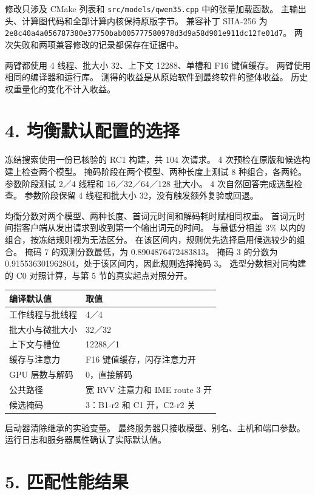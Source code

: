 \documentclass[10pt,a4paper,fontset=none]{ctexart}
\begin{document}
修改只涉及 CMake 列表和 \nolinkurl{src/models/qwen35.cpp}
中的张量加载函数。 主输出头、计算图代码和全部计算内核保持原版字节。
兼容补丁 SHA-256 为
\texttt{2e8c40a4\allowbreak{}a0567873\allowbreak{}80e37750\allowbreak{}bab00577\allowbreak{}7580978d\allowbreak{}3d9a58d9\allowbreak{}01e911dc\allowbreak{}12fe01d7}。
两次失败和两项兼容修改的记录都保存在证据中。

两臂都使用 4 线程、批大小 32、上下文 12288、单槽和 F16 键值缓存。
两臂使用相同的编译器和运行库。
测得的收益是从原始软件到最终软件的整体收益。
历史权重量化的变化不计入收益。

\hypertarget{ux5747ux8861ux9ed8ux8ba4ux914dux7f6eux7684ux9009ux62e9}{%
\section{4.
均衡默认配置的选择}\label{ux5747ux8861ux9ed8ux8ba4ux914dux7f6eux7684ux9009ux62e9}}

冻结搜索使用一份已核验的 RC1 构建，共 104 次请求。 4
次预检在原版和候选构建上检查两个模型。
掩码阶段在两个模型、两种长度上测试 8 种组合，各两轮。 参数阶段测试 2／4
线程和 16／32／64／128 批大小。 4 次自然回答完成选型检查。 参数阶段保留
4 线程和批大小 32，没有触发额外复验或回退。

均衡分数对两个模型、两种长度、首词元时间和解码耗时赋相同权重。
首词元时间指客户端从发出请求到收到第一个输出词元的时间。 与最低分相差
3\% 以内的组合，按冻结规则视为无法区分。
在该区间内，规则优先选择启用候选较少的组合。 掩码 7 的观测分数最低，为
0.8904876472483813。 掩码 3 的分数为
0.915536301962804，处于该区间内，因此规则选择掩码 3。
选型分数相对同构建的 C0 对照计算，与第 5 节的真实起点对照分开。

\begin{longtable}[]{@{}ll@{}}
\toprule
编译默认值 & 取值\tabularnewline
\midrule
\endhead
工作线程与批线程 & 4／4\tabularnewline
批大小与微批大小 & 32／32\tabularnewline
上下文与槽位 & 12288／1\tabularnewline
缓存与注意力 & F16 键值缓存，闪存注意力开\tabularnewline
GPU 层数与解码 & 0，直接解码\tabularnewline
公共路径 & 宽 RVV 注意力和 IME route 3 开\tabularnewline
候选掩码 & 3：B1-r2 和 C1 开，C2-r2 关\tabularnewline
\bottomrule
\end{longtable}

启动器清除继承的实验变量。 最终服务器只接收模型、别名、主机和端口参数。
运行日志和服务器属性确认了实际默认值。

\hypertarget{ux5339ux914dux6027ux80fdux7ed3ux679c}{%
\section{5. 匹配性能结果}\label{ux5339ux914dux6027ux80fdux7ed3ux679c}}
\end{document}
